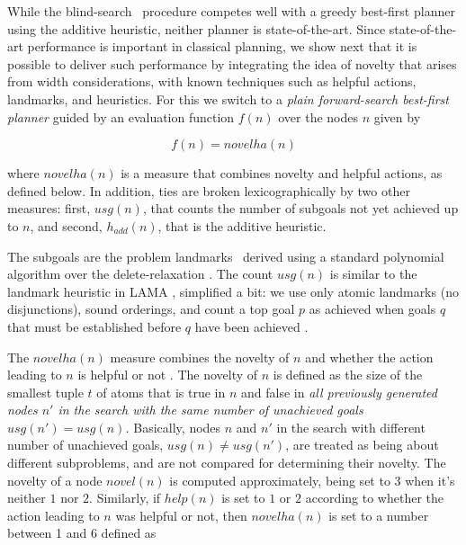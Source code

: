 \documentclass[letterpaper]{article}
\begin{document}
While the blind-search \SR\ procedure competes well with a greedy
best-first planner using the additive heuristic, neither planner is
state-of-the-art. Since state-of-the-art performance is important in
classical planning, we show next that it is possible to deliver such
performance by integrating the idea of novelty that arises from width
considerations, with known techniques such as helpful actions,
landmarks, and heuristics. For this we switch to a \emph{plain
  forward-search best-first planner} guided by an evaluation function
$f(n)$ over the nodes $n$ given by

\begin{equation}
 f(n) =   novelha(n) 
\label{f}
\end{equation}

\noindent where $novelha(n)$ is a measure that combines novelty and
helpful actions, as defined below.  In addition, ties are broken
lexicographically by two other measures: first, $usg(n)$, that counts
the number of subgoals not yet achieved up to $n$, and second,
$h_{add}(n)$, that is the additive heuristic.


The subgoals are the problem landmarks \cite{hoffmann:landmarks}\  derived using a
standard polynomial  algorithm over the delete-relaxation \cite{givan:landmarks,keyder:ecai10}.
The count $usg(n)$ is similar to the landmark heuristic in LAMA \cite{richter:lama},
simplified  a bit:  we use only atomic landmarks (no disjunctions), sound orderings, 
and count a top goal $p$ as achieved when goals $q$ that must be established before
$q$ have been achieved \cite{nir:icaps11}.



The $novelha(n)$ measure combines the novelty of $n$ and whether the action leading to $n$
is helpful or not \cite{hoffmann:ff}. The novelty of $n$ is
defined as the size of the smallest tuple $t$ of atoms that is true in  $n$ and
false in  \emph{all previously generated nodes $n'$ in the search
with the  same number of unachieved goals $usg(n') = usg(n)$.}
Basically, nodes $n$ and $n'$ in the search with different number of unachieved goals,
$usg(n) \not= usg(n')$, are treated as being about different subproblems,
and are not compared for determining their novelty.
The novelty of a node $novel(n)$ is computed approximately, being set to $3$
when it's neither $1$ nor $2$. Similarly, if $help(n)$ is set  to $1$ or $2$
according to whether the action leading to $n$ was helpful or not,
then $novelha(n)$ is set to  a  number between 1 and 6 defined as
\end{document}
